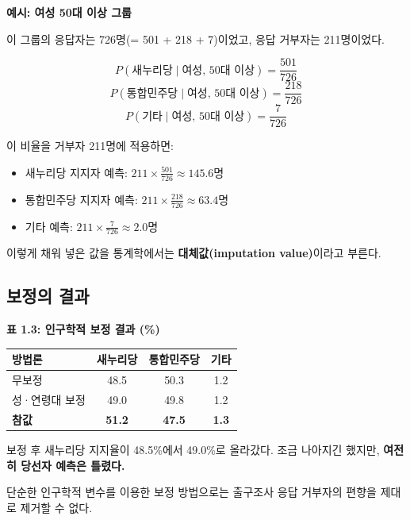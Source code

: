 \documentclass[
  letterpaper,
  DIV=11,
  numbers=noendperiod]{scrreprt}
\newcounter{none} %
\providecommand{\tightlist}{%
  \setlength{\itemsep}{0pt}\setlength{\parskip}{0pt}}
\begin{document}
\textbf{예시: 여성 50대 이상 그룹}

이 그룹의 응답자는 726명(= 501 + 218 + 7)이었고, 응답 거부자는
211명이었다.

\[P(\text{새누리당} \mid \text{여성, 50대 이상}) = \frac{501}{726}\]
\[P(\text{통합민주당} \mid \text{여성, 50대 이상}) = \frac{218}{726}\]
\[P(\text{기타} \mid \text{여성, 50대 이상}) = \frac{7}{726}\]

이 비율을 거부자 211명에 적용하면:

\begin{itemize}
\tightlist
\item
  새누리당 지지자 예측: \(211 \times \frac{501}{726} \approx 145.6\)명
\item
  통합민주당 지지자 예측: \(211 \times \frac{218}{726} \approx 63.4\)명
\item
  기타 예측: \(211 \times \frac{7}{726} \approx 2.0\)명
\end{itemize}

이렇게 채워 넣은 값을 통계학에서는 \textbf{대체값(imputation
value)}이라고 부른다.

\subsection{보정의 결과}\label{uxbcf4uxc815uxc758-uxacb0uxacfc}

\textbf{표 1.3: 인구학적 보정 결과 (\%)}

{\def\LTcaptype{none} %
\begin{longtable}[]{@{}lccc@{}}
\toprule\noalign{}
방법론 & 새누리당 & 통합민주당 & 기타 \\
\midrule\noalign{}
\endhead
\bottomrule\noalign{}
\endlastfoot
무보정 & 48.5 & 50.3 & 1.2 \\
성·연령대 보정 & 49.0 & 49.8 & 1.2 \\
\textbf{참값} & \textbf{51.2} & \textbf{47.5} & \textbf{1.3} \\
\end{longtable}
}

보정 후 새누리당 지지율이 48.5\%에서 49.0\%로 올라갔다. 조금 나아지긴
했지만, \textbf{여전히 당선자 예측은 틀렸다.}

\begin{tcolorbox}[enhanced jigsaw, arc=.35mm, bottomrule=.15mm, bottomtitle=1mm, breakable, colback=white, colbacktitle=quarto-callout-important-color!10!white, colframe=quarto-callout-important-color-frame, coltitle=black, left=2mm, leftrule=.75mm, opacityback=0, opacitybacktitle=0.6, rightrule=.15mm, title=\textcolor{quarto-callout-important-color}{\faExclamation}\hspace{0.5em}{결론}, titlerule=0mm, toprule=.15mm, toptitle=1mm]

단순한 인구학적 변수를 이용한 보정 방법으로는 출구조사 응답 거부자의
편향을 제대로 제거할 수 없다.

\end{tcolorbox}
\end{document}
